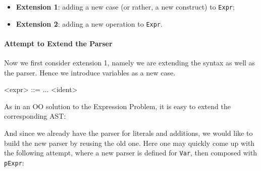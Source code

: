 

\begin{itemize}
\item \textbf{Extension 1}: adding a new case (or rather, a new construct) to \lstinline{Expr};
\item \textbf{Extension 2}: adding a new operation to \lstinline{Expr}.
\end{itemize}

\paragraph{Attempt to Extend the Parser} Now we first consider
extension 1, namely we are extending the syntax as well as the parser. Hence we introduce variables as a new case.

\setlength{\grammarindent}{5em}
\begin{grammar}
<expr> ::= ...
   \alt <ident>
\end{grammar}

As in an OO solution to the Expression Problem, it is easy to extend
the corresponding AST:


And since we already have the parser for literals and additions, we would
like to build the new parser by reusing the old one. Here one may quickly come up
with the following attempt, where a new parser is defined for \lstinline{Var}, then composed
with \lstinline{pExpr}:

